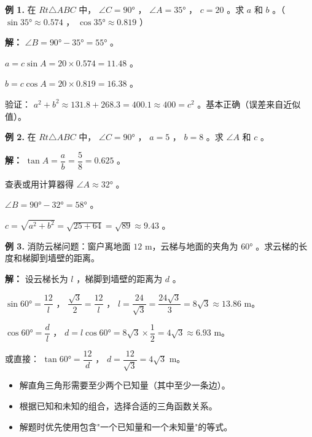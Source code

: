 \begin{workedexamples}


\textbf{例 1.} 在 $Rt\triangle ABC$ 中， $\angle C = 90°$ ， $\angle A = 35°$ ， $c = 20$ 。求 $a$ 和 $b$ 。（ $\sin 35° \approx 0.574$ ， $\cos 35° \approx 0.819$ ）

\textbf{解：}
$\angle B = 90° - 35° = 55°$ 。

$a = c \sin A = 20 \times 0.574 = 11.48$ 。

$b = c \cos A = 20 \times 0.819 = 16.38$ 。

验证： $a^2 + b^2 \approx 131.8 + 268.3 = 400.1 \approx 400 = c^2$ 。基本正确（误差来自近似值）。

\textbf{例 2.} 在 $Rt\triangle ABC$ 中， $\angle C = 90°$ ， $a = 5$ ， $b = 8$ 。求 $\angle A$ 和 $c$ 。

\textbf{解：}
$\tan A = \dfrac{a}{b} = \dfrac{5}{8} = 0.625$ 。

查表或用计算器得 $\angle A \approx 32°$ 。

$\angle B = 90° - 32° = 58°$ 。

$c = \sqrt{a^2 + b^2} = \sqrt{25 + 64} = \sqrt{89} \approx 9.43$ 。

\textbf{例 3.} 消防云梯问题：窗户离地面 $12$ m，云梯与地面的夹角为 $60°$ 。求云梯的长度和梯脚到墙壁的距离。

\textbf{解：}
设云梯长为 $l$ ，梯脚到墙壁的距离为 $d$ 。

$\sin 60° = \dfrac{12}{l}$ ， $\dfrac{\sqrt{3}}{2} = \dfrac{12}{l}$ ， $l = \dfrac{24}{\sqrt{3}} = \dfrac{24\sqrt{3}}{3} = 8\sqrt{3} \approx 13.86$ m。

$\cos 60° = \dfrac{d}{l}$ ， $d = l \cos 60° = 8\sqrt{3} \times \dfrac{1}{2} = 4\sqrt{3} \approx 6.93$ m。

或直接： $\tan 60° = \dfrac{12}{d}$ ， $d = \dfrac{12}{\sqrt{3}} = 4\sqrt{3}$ m。

\end{workedexamples}

\begin{keytakeaway}


\begin{itemize}
  \item 解直角三角形需要至少两个已知量（其中至少一条边）。
  \item 根据已知和未知的组合，选择合适的三角函数关系。
  \item 解题时优先使用包含"一个已知量和一个未知量"的等式。
\end{itemize}


\end{keytakeaway}

